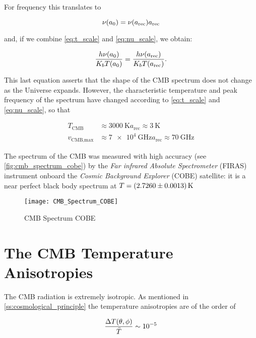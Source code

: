For frequency this translates to

\begin{equation}
        \nu\qty(a_0) = \nu\qty(a_{\text{rec}}) a_{\text{rec}}
        \label{eq:nu_scale}
\end{equation}

and, if we combine \autoref{eq:t_scale} and \autoref{eq:nu_scale}, we
obtain:

\begin{equation}
        \frac{h \nu\qty(a_0)}{K_b T\qty(a_0)} =
        \frac{h \nu\qty(a_{\text{rec}})}{K_b T\qty(a_{\text{rec}})}.
\end{equation}

This last equation asserts that the shape of the CMB spectrum does not
change as the Universe expands. However, the characteristic temperature and
peak frequency of the spectrum have changed according to
\autoref{eq:t_scale} and \autoref{eq:nu_scale}, so that

\begin{align}
        T_{\text{CMB}} & \approx \SI{3000}{\kelvin} a_{\text{rec}} \approx
        \SI{3}{\kelvin} \\
        v_{\text{CMB,max}} & \approx \SI{7e4}{\giga\hertz} a_{\text{rec}}
        \approx \SI{70}{\giga\hertz}
\end{align}

The spectrum of the CMB was measured with high accuracy
(see \autoref{fig:cmb_spectrum_cobe})
by the \emph{Far infrared Absolute Spectrometer} (FIRAS) instrument onboard
the \emph{Cosmic Background Explorer} (COBE) satellite: it is a near
perfect black body spectrum at $T = \SI{2.7260 \pm 0.0013}{\kelvin}$

\begin{figure}
        \centering
        \texttt{[image: CMB\_Spectrum\_COBE]}
        \caption{CMB Spectrum COBE}
        \label{fig:cmb_spectrum_cobe}
\end{figure}

\section{The CMB Temperature Anisotropies}

The CMB radiation is extremely isotropic. As mentioned in
\autoref{ss:cosmological_principle} the temperature anisotropies are of the
order of

\begin{equation}
\frac{\Delta T\qty(\theta,\phi)}{\bar T} \sim \num{e-5}
\end{equation}

